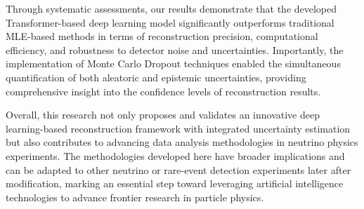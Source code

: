 \begin{enabstract}
Through systematic assessments, our results 
demonstrate that the developed Transformer-based deep learning model 
significantly outperforms traditional MLE-based methods in 
terms of reconstruction precision, computational efficiency, 
and robustness to detector noise and uncertainties. Importantly, 
the implementation of Monte Carlo Dropout techniques enabled the 
simultaneous quantification of both aleatoric and epistemic 
uncertainties, providing comprehensive insight into the 
confidence levels of reconstruction results.

Overall, this research not only proposes and validates an 
innovative deep learning-based reconstruction framework with integrated 
uncertainty estimation but also contributes to 
advancing data analysis methodologies in neutrino physics experiments. 
The methodologies developed here have broader implications and can 
be adapted to other neutrino or rare-event detection experiments 
later after modification, marking an essential step toward 
leveraging artificial intelligence technologies to advance 
frontier research in particle physics.


\end{enabstract}

